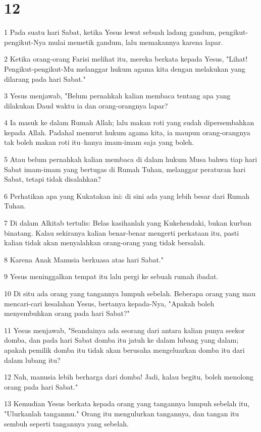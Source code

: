 \chapter{12}

\par 1 Pada suatu hari Sabat, ketika Yesus lewat sebuah ladang gandum, pengikut-pengikut-Nya mulai memetik gandum, lalu memakannya karena lapar.
\par 2 Ketika orang-orang Farisi melihat itu, mereka berkata kepada Yesus, "Lihat! Pengikut-pengikut-Mu melanggar hukum agama kita dengan melakukan yang dilarang pada hari Sabat."
\par 3 Yesus menjawab, "Belum pernahkah kalian membaca tentang apa yang dilakukan Daud waktu ia dan orang-orangnya lapar?
\par 4 Ia masuk ke dalam Rumah Allah; lalu makan roti yang sudah dipersembahkan kepada Allah. Padahal menurut hukum agama kita, ia maupun orang-orangnya tak boleh makan roti itu--hanya imam-imam saja yang boleh.
\par 5 Atau belum pernahkah kalian membaca di dalam hukum Musa bahwa tiap hari Sabat imam-imam yang bertugas di Rumah Tuhan, melanggar peraturan hari Sabat, tetapi tidak disalahkan?
\par 6 Perhatikan apa yang Kukatakan ini: di sini ada yang lebih besar dari Rumah Tuhan.
\par 7 Di dalam Alkitab tertulis: Belas kasihanlah yang Kukehendaki, bukan kurban binatang. Kalau sekiranya kalian benar-benar mengerti perkataan itu, pasti kalian tidak akan menyalahkan orang-orang yang tidak bersalah.
\par 8 Karena Anak Manusia berkuasa atas hari Sabat."
\par 9 Yesus meninggalkan tempat itu lalu pergi ke sebuah rumah ibadat.
\par 10 Di situ ada orang yang tangannya lumpuh sebelah. Beberapa orang yang mau mencari-cari kesalahan Yesus, bertanya kepada-Nya, "Apakah boleh menyembuhkan orang pada hari Sabat?"
\par 11 Yesus menjawab, "Seandainya ada seorang dari antara kalian punya seekor domba, dan pada hari Sabat domba itu jatuh ke dalam lubang yang dalam; apakah pemilik domba itu tidak akan berusaha mengeluarkan domba itu dari dalam lubang itu?
\par 12 Nah, manusia lebih berharga dari domba! Jadi, kalau begitu, boleh menolong orang pada hari Sabat."
\par 13 Kemudian Yesus berkata kepada orang yang tangannya lumpuh sebelah itu, "Ulurkanlah tanganmu." Orang itu mengulurkan tangannya, dan tangan itu sembuh seperti tangannya yang sebelah.
